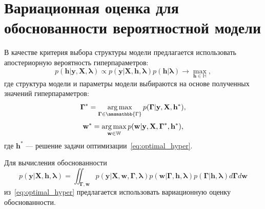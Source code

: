 \section{Вариационная оценка для обоснованности вероятностной модели}
В качестве критерия выбора структуры модели предлагается использовать апостериорную вероятность гиперпараметров:
\begin{equation}
\label{eq:optimal_hyper}
    p(\mathbf{h}|\mathbf{y}, \mathbf{X}, \boldsymbol{\lambda}) \propto p(\mathbf{y}|\mathbf{X}, \mathbf{h}, \boldsymbol{\lambda}) p(\mathbf{h}|\boldsymbol{\lambda}) \to \max_{\mathbf{h} \in \mathbb{H}},
\end{equation}
где структура модели и параметры модели выбираются на основе полученных значений гиперпараметров:
\[
    \boldsymbol{\Gamma}^* = \argmax_{\boldsymbol{\Gamma} \in \amsmathbb{\Gamma}} p(\boldsymbol{\Gamma}|\mathbf{y}, \mathbf{X}, \mathbf{h}^*),
\]
\[
    \mathbf{w}^* = \operatorname*{arg\,max}_{\mathbf{w} \in \mathbb{W}} p(\mathbf{w}|\mathbf{y}, \mathbf{X}, \boldsymbol{\Gamma}^*, \mathbf{h}^*),
\]
где $\mathbf{h}^*$ --- решение задачи оптимизации~\eqref{eq:optimal_hyper}.

Для вычисления обоснованности $$p(\mathbf{y}|\mathbf{X}, \mathbf{h}, \boldsymbol{\lambda}) = \iint_{\boldsymbol{\Gamma},\mathbf{w}}p(\mathbf{y}|\mathbf{X}, \mathbf{w}, \boldsymbol{\Gamma},\boldsymbol{\lambda})p(\mathbf{w}|\boldsymbol{\Gamma},\mathbf{h}, \boldsymbol{\lambda})p(\boldsymbol{\Gamma}|\mathbf{h}, \boldsymbol{\lambda})d\boldsymbol{\Gamma}d\mathbf{w}$$ из~\eqref{eq:optimal_hyper} предлагается использовать вариационную оценку обоснованности.

